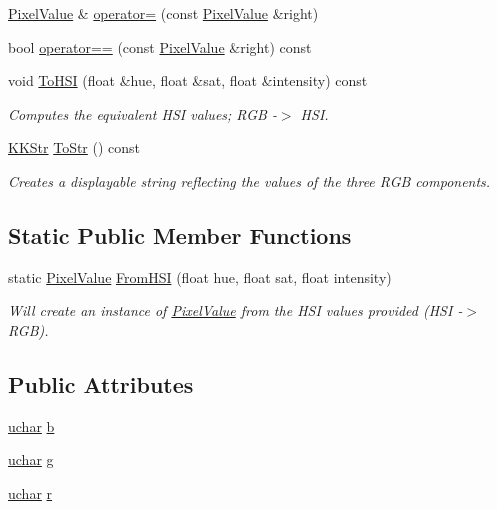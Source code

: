 \begin{DoxyCompactItemize}
\item 
\hyperlink{class_k_k_b_1_1_pixel_value}{Pixel\+Value} \& \hyperlink{class_k_k_b_1_1_pixel_value_ae4d03fa909db025531179e48210eba70}{operator=} (const \hyperlink{class_k_k_b_1_1_pixel_value}{Pixel\+Value} \&right)
\item 
bool \hyperlink{class_k_k_b_1_1_pixel_value_a5d73a568790bcd5cda1d2159ce29dbae}{operator==} (const \hyperlink{class_k_k_b_1_1_pixel_value}{Pixel\+Value} \&right) const 
\item 
void \hyperlink{class_k_k_b_1_1_pixel_value_ac0e01fee6a5f4054b5fac3a4e5393857}{To\+H\+SI} (float \&hue, float \&sat, float \&intensity) const 
\begin{DoxyCompactList}\small\item\em Computes the equivalent H\+SI values; R\+GB -\/$>$ H\+SI. \end{DoxyCompactList}\item 
\hyperlink{class_k_k_b_1_1_k_k_str}{K\+K\+Str} \hyperlink{class_k_k_b_1_1_pixel_value_abf595bf550096b553018c02e9f85733e}{To\+Str} () const 
\begin{DoxyCompactList}\small\item\em Creates a displayable string reflecting the values of the three R\+GB components. \end{DoxyCompactList}\end{DoxyCompactItemize}
\subsection*{Static Public Member Functions}
\begin{DoxyCompactItemize}
\item 
static \hyperlink{class_k_k_b_1_1_pixel_value}{Pixel\+Value} \hyperlink{class_k_k_b_1_1_pixel_value_a1aed38456fe38d925a5fdeb25d94cd6f}{From\+H\+SI} (float hue, float sat, float intensity)
\begin{DoxyCompactList}\small\item\em Will create an instance of \hyperlink{class_k_k_b_1_1_pixel_value}{Pixel\+Value} from the H\+SI values provided (H\+SI -\/$>$ R\+GB). \end{DoxyCompactList}\end{DoxyCompactItemize}
\subsection*{Public Attributes}
\begin{DoxyCompactItemize}
\item 
\hyperlink{namespace_k_k_b_ace9969169bf514f9ee6185186949cdf7}{uchar} \hyperlink{class_k_k_b_1_1_pixel_value_ac43e49760f71b756dba6c40e80e7917a}{b}
\item 
\hyperlink{namespace_k_k_b_ace9969169bf514f9ee6185186949cdf7}{uchar} \hyperlink{class_k_k_b_1_1_pixel_value_ab9b7056f3cf6f67a5987a8119ceaab67}{g}
\item 
\hyperlink{namespace_k_k_b_ace9969169bf514f9ee6185186949cdf7}{uchar} \hyperlink{class_k_k_b_1_1_pixel_value_a734e16b4afd9a270df67aa1ce726e2d0}{r}
\end{DoxyCompactItemize}

